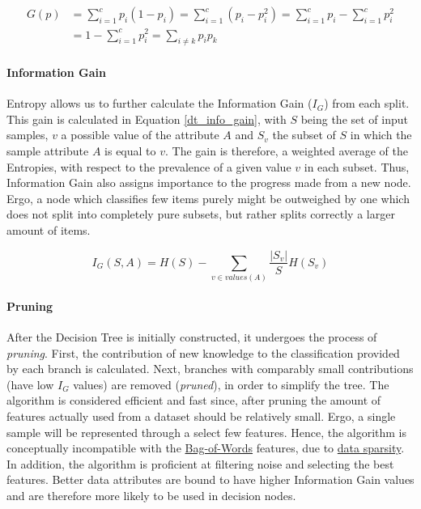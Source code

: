	 \begin{equation}
	 	\begin{aligned}
		 	G(p) &= \sum_{i=1}^c p_i(1-p_i) = \sum_{i=1}^c (p_i-p_i^2) =\sum_{i=1}^c p_i - \sum_{i=1}^c p_i^2 \\  &=  1 - \sum_{i=1}^c p_i^2 = \sum_{i \neq k} p_i p_k
	 	\end{aligned}
		\label{dt_gini}
	 \end{equation}
	 
	 \paragraph{Information Gain}
	 \label{info_gain}	
	 	Entropy allows us to further calculate the Information Gain ($ I_G $) from each split. This gain is calculated in Equation \ref{dt_info_gain}, with $ S $ being the set of input samples, $ v $ a possible value of the attribute $ A $ and $ S_v $ the subset of $ S $ in which the sample attribute $ A $ is equal to $ v $. The gain is therefore, a weighted average of the Entropies, with respect to the prevalence of a given value $ v $ in each subset. Thus, Information Gain also assigns importance to the progress made from a new node. Ergo, a node which classifies few items purely might be outweighed by one which does not split into completely pure subsets, but rather splits correctly a larger amount of items.
	 
			\begin{equation}
			I_G(S,A) = H(S) - \sum_{v \in values(A) } \frac{|S_v|}{S} H(S_v)
			\label{dt_info_gain}
	 \end{equation}
	 
	 \paragraph{Pruning}
		 After the Decision Tree is initially constructed, it undergoes the process of \textit{pruning}. First, the contribution of new knowledge to the classification provided by each branch is calculated. Next, branches with comparably small contributions (have low $ I_G $ values) are removed (\textit{pruned}), in order to simplify the tree. The algorithm is considered efficient and fast since, after pruning the amount of features actually used from a dataset should be relatively small. Ergo, a single sample will be represented through a select few features. Hence, the algorithm is conceptually incompatible with the \hyperref[sec:bag_of_words]{Bag-of-Words} features, due to \hyperref[data_sparsity]{data sparsity}.  In addition, the algorithm is proficient at filtering noise and selecting the best features. Better data attributes are bound to have higher Information Gain values and are therefore more likely to be used in decision nodes.
	
